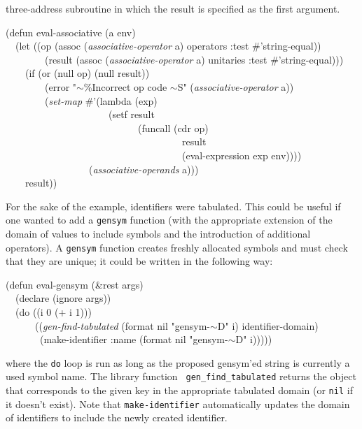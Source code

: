 three-address subroutine in which the result is specified as the first
argument. 
\begin{pgm}
(defun eval-associative (a env) \\
~~(let ((op (assoc ({\sl associative-operator} a) operators 
                                :test \#'string-equal)) \\
~~~~~~~~(result (assoc ({\sl associative-operator} a) unitaries 
                                :test \#'string-equal))) \\ 
~~~~(if (or (null op) (null result)) \\
~~~~~~~~(error "$\sim$\%Incorrect op code $\sim$S" ({\sl associative-operator} a)) \\
~~~~~~~~({\sl set-map} \#'(lambda (exp) \\
~~~~~~~~~~~~~~~~~~~~~(setf result  \\
~~~~~~~~~~~~~~~~~~~~~~~~~~~(funcall (cdr op) \\
~~~~~~~~~~~~~~~~~~~~~~~~~~~~~~~~~~~~result  \\
~~~~~~~~~~~~~~~~~~~~~~~~~~~~~~~~~~~~(eval-expression exp env)))) \\
~~~~~~~~~~~~~~~~~({\sl associative-operands} a))) \\
~~~~result)) \\
\end{pgm}
For the sake of the example, identifiers were tabulated. This could be
useful if one wanted to add a {\tt gensym} function (with the
appropriate extension of the domain of values to include symbols and the
introduction of additional operators). A {\tt gensym} function creates
freshly allocated symbols and must check that they are unique; it could
be written in the following way:
\begin{pgm}
(defun eval-gensym (\&rest args) \\
~~(declare (ignore args)) \\
~~(do ((i 0 (+ i 1))) \\
~~~~~~(({\sl gen-find-tabulated} (format nil "gensym-$\sim$D" i)
                                 identifier-domain)\\
~~~~~~~(make-identifier :name  (format nil "gensym-$\sim$D" i)))))
\end{pgm}
where the {\tt do} loop is run as long as the proposed gensym'ed string
is currently a used symbol name. The library function {\tt
gen\_find\_tabulated} returns the object that corresponds to the given
key in the appropriate tabulated domain (or {\tt nil} if it doesn't
exist). Note that {\tt make-identifier} automatically updates the domain
of identifiers to include the newly created identifier.

